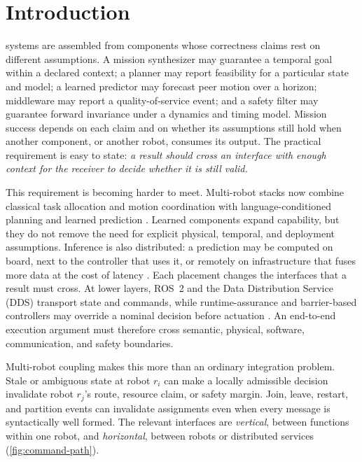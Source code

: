 \section{Introduction}
\label{sec:introduction}

 systems are assembled from components whose
correctness claims rest on different assumptions.  A mission synthesizer may
guarantee a temporal goal within a declared context; a planner may report
feasibility for a particular state and model; a learned predictor may forecast
peer motion over a horizon; middleware may report a quality-of-service event;
and a safety filter may guarantee forward invariance under a dynamics and timing
model.  Mission success depends on each claim and on whether its assumptions
still hold when another component, or another robot, consumes its output.  The
practical requirement is easy to state: \emph{a result should cross an
interface with enough context for the receiver to decide whether it is still
valid.}

This requirement is becoming harder to meet.  Multi-robot stacks now combine
classical task allocation and motion coordination
\cite{gerkey2004mrta,choi2009cbba,sharon2015cbs} with language-conditioned
planning and learned prediction \cite{mandi2024roco,obata2025lipllm,li2026llmmrs}.
Learned components expand capability, but they do not remove the need for
explicit physical, temporal, and deployment assumptions.  Inference is also
distributed: a prediction may be computed on board, next to the controller that
uses it, or remotely on infrastructure that fuses more data at the cost of
latency \cite{kehoe2015cloud}.  Each placement changes the interfaces that a
result must cross.  At lower layers, ROS~2 and the Data Distribution Service
(DDS) transport state and commands, while runtime-assurance and barrier-based
controllers may override a nominal decision before actuation
\cite{macenski2022ros2,omg2015dds,desai2019soter,wang2017barrier}.  An
end-to-end execution argument must therefore cross semantic, physical,
software, communication, and safety boundaries.

Multi-robot coupling makes this more than an ordinary integration problem.
Stale or ambiguous state at robot $r_i$ can make a locally admissible decision
invalidate robot $r_j$'s route, resource claim, or safety margin.  Join, leave,
restart, and partition events can invalidate assignments even when every message
is syntactically well formed.  The relevant interfaces are \emph{vertical},
between functions within one robot, and \emph{horizontal}, between robots or
distributed services (\cref{fig:command-path}).

